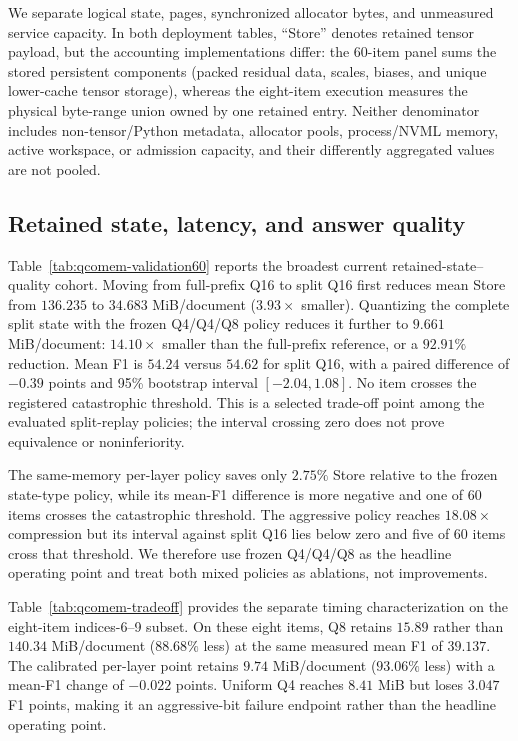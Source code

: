 \documentclass{article}
\begin{document}
We separate logical state, pages, synchronized allocator bytes, and unmeasured
service capacity.  In both deployment tables, ``Store'' denotes retained tensor
payload, but the accounting implementations differ: the 60-item panel sums the
stored persistent components (packed residual data, scales, biases, and unique
lower-cache tensor storage), whereas the eight-item execution measures the
physical byte-range union owned by one retained entry.  Neither denominator
includes non-tensor/Python metadata, allocator pools, process/NVML memory,
active workspace, or admission capacity, and their differently aggregated
values are not pooled.

\subsection{Retained state, latency, and answer quality}

Table~\ref{tab:qcomem-validation60} reports the broadest current
retained-state--quality cohort.  Moving from full-prefix Q16 to split Q16 first
reduces mean Store from $136.235$ to $34.683$ MiB/document ($3.93\times$
smaller).  Quantizing the complete split state with the frozen Q4/Q4/Q8 policy
reduces it further to $9.661$ MiB/document: $14.10\times$ smaller than the
full-prefix reference, or a $92.91\%$ reduction.  Mean F1 is $54.24$ versus
$54.62$ for split Q16, with a paired difference of $-0.39$ points and 95\%
bootstrap interval $[-2.04,1.08]$.  No item crosses the registered
catastrophic threshold.  This is a selected trade-off point among the evaluated
split-replay policies; the interval crossing zero does not prove equivalence or
noninferiority.

The same-memory per-layer policy saves only $2.75\%$ Store relative to the
frozen state-type policy, while its mean-F1 difference is more negative and
one of 60 items crosses the catastrophic threshold.  The aggressive policy
reaches $18.08\times$ compression but its interval against split Q16 lies below
zero and five of 60 items cross that threshold.  We therefore use frozen
Q4/Q4/Q8 as the headline operating point and treat both mixed policies as
ablations, not improvements.



Table~\ref{tab:qcomem-tradeoff} provides the separate timing characterization
on the eight-item indices-6--9 subset.
On these eight items, Q8 retains $15.89$ rather than $140.34$ MiB/document
($88.68\%$ less) at the same measured mean F1 of $39.137$.  The calibrated
per-layer point retains $9.74$ MiB/document ($93.06\%$ less) with a mean-F1
change of $-0.022$ points.  Uniform Q4 reaches $8.41$ MiB but loses $3.047$ F1
points, making it an aggressive-bit failure endpoint rather than the headline
operating point.
\end{document}
